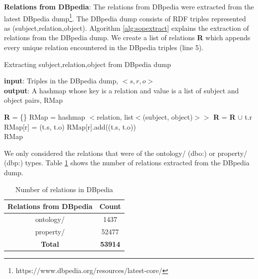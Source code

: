 \begin{sloppypar}
\textbf{Relations from DBpedia}: \label{sec:relationsfromdbpedia} The relations from DBpedia were extracted from the latest DBpedia dump\footnote{https://www.dbpedia.org/resources/latest-core/}. The DBpedia dump consists of RDF triples represented as (subject,relation,object). Algorithm \ref{alg:sopextract}  explains the extraction of relations from the DBpedia dump.
We create a list of relations \textbf{R} which appends every unique relation encountered in the DBpedia triples (line 5).

\begin{singlespace}
\begin{algorithm}
\caption{Extracting subject,relation,object from DBpedia dump}\label{alg:sopextract}
 \hspace*{\algorithmicindent} \textbf{input}: Triples in the DBpedia dump, $<s,r,o>$ \\
 \hspace*{\algorithmicindent} \textbf{output}:  A hashmap whose key is a relation and value is a list of subject and object pairs, RMap
\begin{algorithmic}[1]
\State \textbf{R} = \{\}
\State RMap = hashmap $<$relation, list$<$(subject, object)$>>$
    \State 	\textbf{R} = \textbf{R} $\cup$ t.r
    \State 	RMap[r] = {(t.s, t.o)}
\Else
\State 	RMap[r].add((t.s, t.o))
\EndIf
\EndFor \\
\Return RMap
\end{algorithmic}
\end{algorithm}
\end{singlespace}

We only considered the relations that were of the  ontology/ (dbo:) or property/ (dbp:) types. Table \ref{tab:countrelations} shows the number of relations extracted from the DBpedia dump.
\begin{table}[H]
    \centering
    \begin{tabular}{|c|c|}
     \hline
     \textbf{Relations from DBpedia} & \textbf{Count} \\
    \hline
     ontology/ & 1437 \\
    \hline
    property/ & 52477 \\
    \hline
    \textbf{Total} & \textbf{53914} \\
    \hline
    \end{tabular}
    \caption{Number of relations in DBpedia}
    \label{tab:countrelations}
\end{table}


\end{sloppypar}
